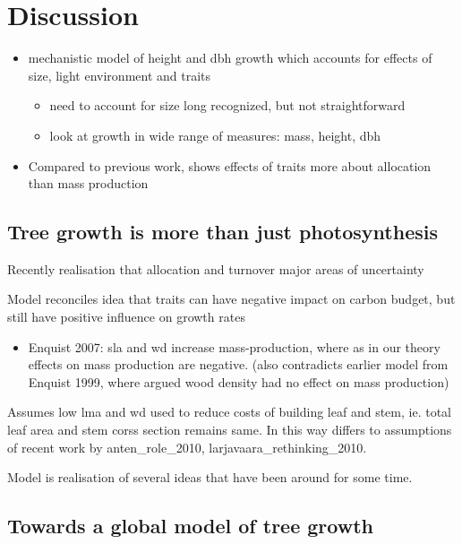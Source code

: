 \documentclass[12pt, a4paper]{article}
\begin{document}
\section*{Discussion}\label{discussion}

\begin{itemize}
\itemsep1pt\parskip0pt
\item
  mechanistic model of height and dbh growth which accounts for effects
  of size, light environment and traits

  \begin{itemize}
  \itemsep1pt\parskip0pt
  \item
    need to account for size long recognized, but not straightforward
  \item
    look at growth in wide range of measures: mass, height, dbh
  \end{itemize}
\item
  Compared to previous work, shows effects of traits more about
  allocation than mass production
\end{itemize}

\subsection*{Tree growth is more than just
photosynthesis}\label{tree-growth-is-more-than-just-photosynthesis}

Recently realisation that allocation and turnover major areas of
uncertainty

Model reconciles idea that traits can have negative impact on carbon
budget, but still have positive influence on growth rates

\begin{itemize}
\itemsep1pt\parskip0pt
\item
  Enquist 2007: sla and wd increase mass-production, where as in our
  theory effects on mass production are negative. (also contradicts
  earlier model from Enquist 1999, where argued wood density had no
  effect on mass production)
\end{itemize}

Assumes low lma and wd used to reduce costs of building leaf and stem,
ie. total leaf area and stem corss section remains same. In this way
differs to assumptions of recent work by anten\_role\_2010,
larjavaara\_rethinking\_2010.

Model is realisation of several ideas that have been around for some
time.

\subsection*{Towards a global model of tree
growth}\label{towards-a-global-model-of-tree-growth}
\end{document}
